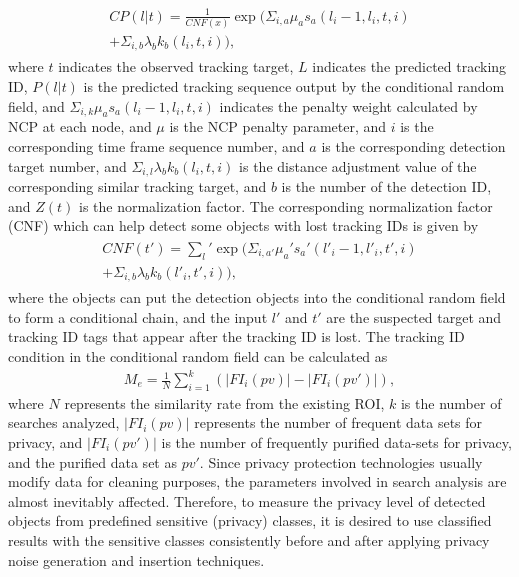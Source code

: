 \documentclass[trans]{IEEEtran}
\begin{document}
\begin{eqnarray}\label{equ:Stt}
\begin{aligned}
CP(l|t) = \frac{1}{CNF(x)} \exp (\Sigma_{i,a} \mu_a s_a (l_i - 1, l_i, t, i )  \\ 
+ \Sigma_{i,b} \lambda_b k_b (l_i,t,i) ) ,
\end{aligned}
\end{eqnarray}
where $t$ indicates the observed tracking target, $L$ indicates the predicted tracking ID, $P(l|t)$ is the predicted tracking sequence output by the conditional random field, and $\Sigma_{i,k} \mu_a s_a(l_i-1, l_i, t, i )$ indicates the penalty weight calculated by NCP at each node, and $ \mu$ is the NCP penalty parameter, and $i$ is the corresponding time frame sequence number, and $a$ is the corresponding detection target number, and $\Sigma_{i,l} \lambda_b k_b(l_i,t,i)$ is the distance adjustment value of the corresponding similar tracking target, and $b$ is the number of the detection ID, and $Z(t)$ is the normalization factor. The corresponding normalization factor (CNF) which can help detect some objects with lost tracking IDs is given by
\begin{eqnarray}\label{equ:NF1}
\begin{aligned}
CNF(t') = \sum_l' \exp (\Sigma_{i,a'} \mu_a' s_a' (l'_i - 1, l'_i, t', i )  \\
+ \Sigma_{i,b} \lambda_b k_b (l'_i,t',i) ) ,
\end{aligned}
\end{eqnarray}
where the objects can put the detection objects into the conditional random field to form a conditional chain, and the input $l'$ and $t'$ are the suspected target and tracking ID tags that appear after the tracking ID is lost. The tracking ID condition in the conditional random field can be calculated as
\begin{eqnarray}\label{equ:Medet}
M_e = \frac{1}{N} \sum^{k}_{i=1} (|FI_i(pv)|-|FI_i(pv')|),
\end{eqnarray}
where $N$ represents the similarity rate from the existing ROI, $k$ is the number of searches analyzed,  $|FI_i(pv)|$ represents the number of frequent data sets for privacy, and $|FI_i(pv')|$  is the number of frequently purified data-sets for privacy, and the purified data set as $pv'$. Since privacy protection technologies usually modify data for cleaning purposes, the parameters involved in search analysis are almost inevitably affected. Therefore, to measure the privacy level of detected objects from predefined sensitive (privacy) classes, it is desired to use classified results with the sensitive classes consistently before and after applying privacy noise generation and insertion techniques.
\end{document}
